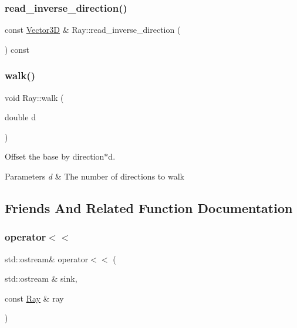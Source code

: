 \subsubsection{\texorpdfstring{read\_inverse\_direction()}{read\_inverse\_direction()}}
{\footnotesize\ttfamily const \mbox{\hyperlink{classVector3D}{Vector3D}} \& Ray\+::read\+\_\+inverse\+\_\+direction (\begin{DoxyParamCaption}{ }\end{DoxyParamCaption}) const}

\mbox{\label{classRay_af986618fceed92c3c189f8950deb6d21}} 
\subsubsection{\texorpdfstring{walk()}{walk()}}
{\footnotesize\ttfamily void Ray\+::walk (\begin{DoxyParamCaption}\item[{double}]{d }\end{DoxyParamCaption})}



Offset the base by direction$\ast$d. 


\begin{DoxyParams}{Parameters}
{\em d} & The number of directions to walk \\
\hline
\end{DoxyParams}


\subsection{Friends And Related Function Documentation}
\mbox{\label{classRay_a419823895c7cde830e4b34018dec9c2f}} 
\subsubsection{\texorpdfstring{operator$<$$<$}{operator<<}}
{\footnotesize\ttfamily std\+::ostream\& operator$<$$<$ (\begin{DoxyParamCaption}\item[{std\+::ostream \&}]{sink,  }\item[{const \mbox{\hyperlink{classRay}{Ray}} \&}]{ray }\end{DoxyParamCaption})\hspace{0.3cm}{\ttfamily [friend]}}



